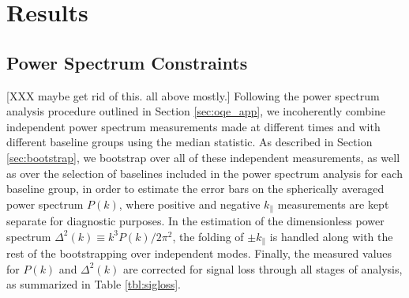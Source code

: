 \documentclass[twocolumn,numberedappendix]{emulateapj} \shorttitle{New Limits on the 21 cm Power Spectrum at $z=8.4$}
\begin{document}
%




\section{Results}\label{sec:results}

\subsection{Power Spectrum Constraints}
[XXX maybe get rid of this. all above mostly.]
Following the power spectrum analysis procedure outlined in Section \ref{sec:oqe_app},
we incoherently combine independent power spectrum measurements made at different
times and with different baseline groups using the median statistic.  As described
in Section \ref{sec:bootstrap}, we bootstrap over all of these independent measurements,
as well as over the selection of baselines included in the power spectrum analysis for
each baseline group, in order to estimate the error bars on the spherically averaged
power spectrum $P(k)$, where positive and negative $k_\parallel$ measurements
are kept separate for diagnostic purposes.  In the estimation of the 
dimensionless power spectrum
$\Delta^{2}(k)\equiv{k^{3}P(k)}/{2\pi^{2}}$, the folding of $\pm k_\parallel$ is
handled along with the rest of the bootstrapping over independent modes.
Finally, the measured values for $P(k)$ and $\Delta^2(k)$ are corrected for signal
loss through all stages of analysis, as summarized in Table \ref{tbl:sigloss}.
\end{document}
